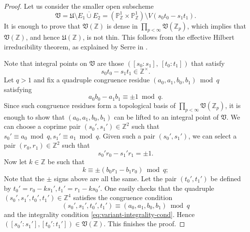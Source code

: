 \documentclass[a4paper, twoside, 11pt]{amsart}
\theoremstyle{definition}
\newcommand{\mU}{\mathfrak{U}}
\newcommand{\mV}{\mathfrak{V}}
\newcommand{\PP}{\mathbb{P}}
\newcommand{\ZZ}{\mathbb{Z}}
\begin{document}
\begin{proof}
Let us consider the smaller open subscheme 
	\begin{equation*}
		\mV = \mU\setminus \overline{E_1 \cup E_2} = (\PP^1_\ZZ \times \PP^1_\ZZ) \setminus V(s_0t_0-s_1t_1).
	\end{equation*}
	It is enough to prove that $\mV(\ZZ)$ is dense in $\prod_{p<\infty}\mV(\ZZ_p)$, which implies that $\mV(\ZZ)$, and hence $\mU(\ZZ)$, is not thin. This follows from the effective Hilbert irreducibility theorem, as explained by Serre in \cite[\S3.6~Proof of Prop. 3.5.2]{SerreGalois}.
    
	Note that integral points on $\mV$ are those
	$([s_0:s_1],\ [t_0:t_1])$ 
	that satisfy
	\begin{equation}\label{eq:variant-integrality-cond}
		s_0t_0-s_1t_1 \in \ZZ^\times.
	\end{equation}
    Let $q > 1$ and fix a quadruple congruence residue $(a_0,a_1,b_0,b_1)\bmod q$ 
	satisfying \begin{equation*}
    a_0b_0-a_1b_1\equiv \pm 1\bmod q.
\end{equation*} Since such congruence residues form a topological basis of $\prod_{p<\infty}\mV(\ZZ_p)$, it is enough to show that $(a_0,a_1,b_0,b_1)$ can be lifted to an integral point of $\mV$. We can choose a coprime pair $(s_0',s_1')\in\ZZ^2$ such that $s_0'\equiv a_0\bmod q,s_1'\equiv a_1\bmod q$. Given such a pair $(s_0',s_1')$, we can select a pair $(r_0,r_1)\in\ZZ^2$ such that $$s_0'r_0-s_1'r_1=\pm 1.$$
	Now let $k\in\ZZ$ be such that
	\begin{equation*}
		k\equiv \pm(b_0r_1-b_1r_0)\bmod q;
	\end{equation*} 
    Note that the $\pm$ signs above are all the same. 
	Let the pair $(t_0',t_1')$ be defined by $t_0'=r_0-ks_1',t_1'=r_1-ks_0'$. One easily checks that the quadruple $(s_0',s_1',t_0',t_1')\in\ZZ^4$ satisfies the congruence condition 
	\begin{equation*}
		(s_0',s_1',t_0',t_1')\equiv (a_0,a_1,b_0,b_1)\bmod q
	\end{equation*}
	and the integrality condition \eqref{eq:variant-integrality-cond}. Hence $([s_0':s_1'],[t_0':t_1'])\in\mV(\ZZ)$. This finishes the proof.
\end{proof}
\end{document}
